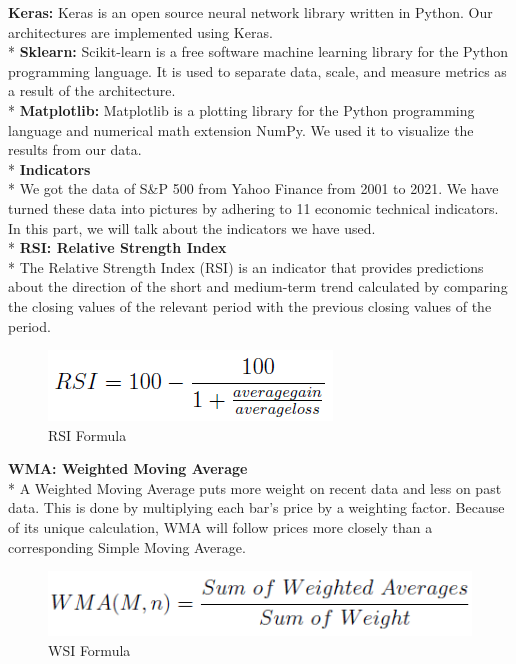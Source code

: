 \documentclass{article}
\begin{document}
\textbf{Keras:} Keras is an open source neural network library written in Python. Our architectures are implemented using Keras.\vspace{0.1cm}\\*
\textbf{Sklearn:} Scikit-learn is a free software machine learning library for the Python programming language. It is used to separate data, scale, and measure metrics as a result of the architecture.\vspace{0.1cm}\\*
\textbf{Matplotlib:} Matplotlib is a plotting library for the Python programming language and numerical math extension NumPy. We used it to visualize the results from our data.\vspace{0.5cm}\\*
\textbf{\large Indicators} \vspace{0.1cm}\\*
We got the data of S\&P 500 from Yahoo Finance from 2001 to 2021. We have turned these data into pictures by adhering to 11 economic technical indicators. In this part, we will talk about the indicators we have used.\vspace{0.3cm}\\*
\textbf{RSI: Relative Strength Index}\\*
The Relative Strength Index (RSI) is an indicator that provides predictions about the direction of the short and medium-term trend calculated by comparing the closing values of the relevant period with the previous closing values of the period.
\begin{figure}[H]
\begin{center}
   \includegraphics[scale=1]{Assets/rsi.png}
   \caption{RSI Formula}
\end{center}
\end{figure}
\noindent
\textbf{WMA: Weighted Moving Average} \\*
A Weighted Moving Average puts more weight on recent data and less on past data. This is done by multiplying each bar’s price by a weighting factor. Because of its unique calculation, WMA will follow prices more closely than a corresponding Simple Moving Average.
\begin{figure}[H]
\begin{center}
   \includegraphics[scale=0.8]{Assets/wma.png}
   \caption{WSI Formula}
\end{center}
\end{figure}
\end{document}
